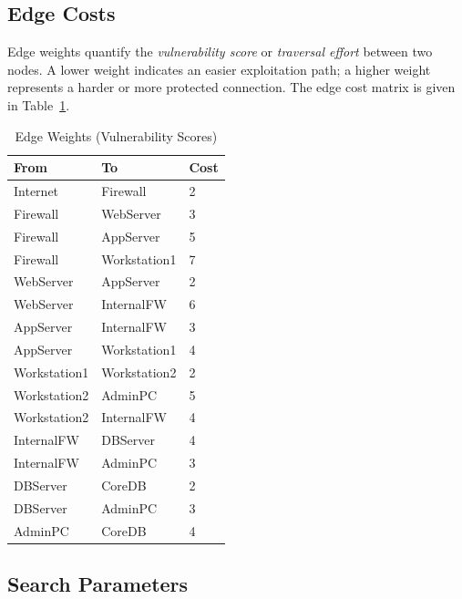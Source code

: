 \documentclass[12pt,a4paper]{article}
\begin{document}
\subsection{Edge Costs}

Edge weights quantify the \textit{vulnerability score} or \textit{traversal effort}
between two nodes. A lower weight indicates an easier exploitation path; a higher weight
represents a harder or more protected connection. The edge cost matrix is given in
Table~\ref{tab:edges}.

\begin{table}[H]
    \centering
    \caption{Edge Weights (Vulnerability Scores)}
    \label{tab:edges}
    \begin{tabular}{lll}
        \toprule
        \textbf{From} & \textbf{To} & \textbf{Cost} \\
        \midrule
        Internet      & Firewall      & 2 \\
        Firewall      & WebServer     & 3 \\
        Firewall      & AppServer     & 5 \\
        Firewall      & Workstation1  & 7 \\
        WebServer     & AppServer     & 2 \\
        WebServer     & InternalFW    & 6 \\
        AppServer     & InternalFW    & 3 \\
        AppServer     & Workstation1  & 4 \\
        Workstation1  & Workstation2  & 2 \\
        Workstation2  & AdminPC       & 5 \\
        Workstation2  & InternalFW    & 4 \\
        InternalFW    & DBServer      & 4 \\
        InternalFW    & AdminPC       & 3 \\
        DBServer      & CoreDB        & 2 \\
        DBServer      & AdminPC       & 3 \\
        AdminPC       & CoreDB        & 4 \\
        \bottomrule
    \end{tabular}
\end{table}

\subsection{Search Parameters}
\end{document}
